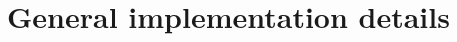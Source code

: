 \documentclass[Main]{subfiles}
\begin{document}
\section{General implementation details}\label{sec:generalImpDetails}
\end{document}
